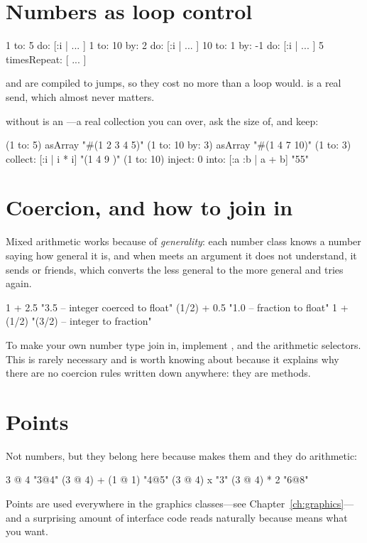 \section{Numbers as loop control}

\begin{st}
1 to: 5 do: [:i | ... ]
1 to: 10 by: 2 do: [:i | ... ]
10 to: 1 by: -1 do: [:i | ... ]
5 timesRepeat: [ ... ]
\end{st}

 and  are compiled to jumps, so they cost no more
than a  loop would.  is a real send, which almost
never matters.

 without  is an ---a real collection you can
 over, ask the size of, and keep:

\begin{st}
(1 to: 5) asArray                    "#(1 2 3 4 5)"
(1 to: 10 by: 3) asArray             "#(1 4 7 10)"
(1 to: 3) collect: [:i | i * i]      "(1 4 9 )"
(1 to: 10) inject: 0 into: [:a :b | a + b]   "55"
\end{st}

\section{Coercion, and how to join in}

Mixed arithmetic works because of \emph{generality}: each number class knows a
number saying how general it is, and when \ct{+} meets an argument it does not
understand, it sends  or friends, which
converts the less general to the more general and tries again.

\begin{st}
1 + 2.5             "3.5   -- integer coerced to float"
(1/2) + 0.5         "1.0   -- fraction to float"
1 + (1/2)           "(3/2) -- integer to fraction"
\end{st}

To make your own number type join in, implement ,
 and the arithmetic selectors. This is rarely necessary and is
worth knowing about because it explains why there are no coercion rules
written down anywhere: they are methods.

\section{Points}

Not numbers, but they belong here because  makes them and they do
arithmetic:

\begin{st}
3 @ 4                       "3@4"
(3 @ 4) + (1 @ 1)           "4@5"
(3 @ 4) x                   "3"
(3 @ 4) * 2                 "6@8"
\end{st}

Points are used everywhere in the graphics classes---see
Chapter~\ref{ch:graphics}---and a surprising amount of interface code reads
naturally because  means what you want.
